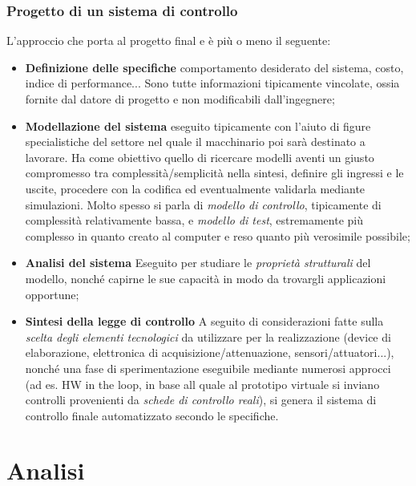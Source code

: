 \documentclass[a4paper]{report}
\begin{document}

\section{Progetto di un sistema di controllo}

L'approccio che porta al progetto final e è più o meno il seguente:
\begin{itemize}
	\item \textbf{Definizione delle specifiche} \rarr comportamento desiderato del sistema, costo, indice di performance... Sono tutte informazioni tipicamente vincolate, ossia fornite dal datore di progetto e non modificabili dall'ingegnere;
	\item \textbf{Modellazione del sistema} \rarr eseguito tipicamente con l'aiuto di figure specialistiche del settore nel quale il macchinario poi sarà destinato a lavorare. Ha come obiettivo quello di ricercare modelli aventi un giusto compromesso tra complessità/semplicità nella sintesi, definire gli ingressi e le uscite, procedere con la codifica ed eventualmente validarla mediante simulazioni. Molto spesso si parla di \textit{modello di controllo}, tipicamente di complessità relativamente bassa, e \textit{modello di test}, estremamente più complesso in quanto creato al computer e reso quanto più verosimile possibile;
	\item \textbf{Analisi del sistema} \rarr Eseguito per studiare le \textit{proprietà strutturali} del modello, nonché capirne le sue capacità in modo da trovargli applicazioni opportune;
	\item \textbf{Sintesi della legge di controllo} \rarr A seguito di considerazioni fatte sulla \textit{scelta degli elementi tecnologici} da utilizzare per la realizzazione (device di elaborazione, elettronica di acquisizione/attenuazione, sensori/attuatori...), nonché una fase di sperimentazione eseguibile mediante numerosi approcci (ad es. HW in the loop, in base all quale al prototipo virtuale si inviano controlli provenienti da \textit{schede di controllo reali}), si genera il sistema di controllo finale automatizzato secondo le specifiche.
\end{itemize}

\part{Analisi}
\end{document}
